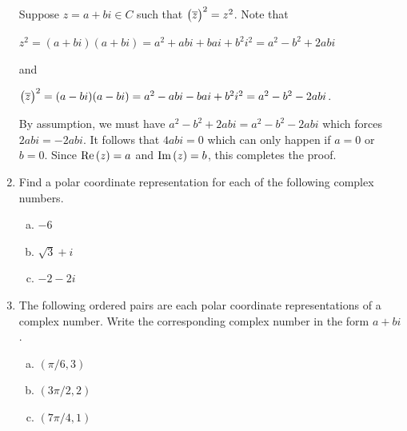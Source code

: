 \documentclass[11pt,fleqn,dvipsnames,usenames]{article}
\begin{document}
\begin{enumerate}
\solution Suppose $z = a + bi\in C$ such that $\big(\overline{z}\big)^2 = z^2$.  Note that
\begin{center}
$z^2 = (a + bi)(a + bi) = a^2 + abi + bai + b^2i^2 = a^2 - b^2 + 2abi$
\end{center}
and
\begin{center}
$\big(\overline{z}\big)^2 = (a - bi)(a - bi) = a^2 - abi - bai + b^2i^2 = a^2 - b^2 - 2abi$.
\end{center}
By assumption, we must have $a^2 - b^2 + 2abi = a^2 - b^2 - 2abi$ which forces $2abi = -2abi$.  It follows that $4abi = 0$ which can only happen if $a = 0$ or $b=0$.  Since $\text{Re}\left(z\right) = a$ and $\text{Im}\left(z\right) = b$, this completes the proof.
\item Find a polar coordinate representation for each of the following complex numbers.
\begin{multicols}{3}
\begin{enumerate}[(a)]
\item $-6$
\item $\sqrt{3} + i$
\item $-2-2i$
\end{enumerate}
\end{multicols}
\item The following ordered pairs are each polar coordinate representations of a complex number.  Write the corresponding complex number in the form $a + bi$.
\begin{multicols}{3}
\begin{enumerate}[(a)]
\item $(\pi/6,3)$
\item $(3\pi/2,2)$
\item $(7\pi/4,1)$
\end{enumerate}

\end{multicols}
\end{enumerate}
\end{document}
